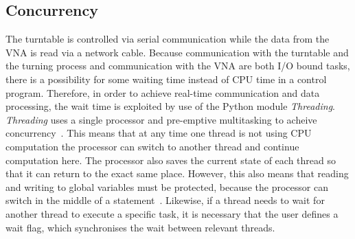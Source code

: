 \subsection{Concurrency}
The turntable is controlled via serial communication while the data from the VNA is read via a network cable. Because communication with the turntable and the turning process and communication with the VNA are both I/O bound tasks, there is a possibility for some waiting time instead of CPU time in a control program. Therefore, in order to achieve real-time communication and data processing, the wait time is exploited by use of the Python module \textit{Threading}. \textit{Threading} uses a single processor and pre-emptive multitasking to acheive concurrency~\cite{concurrency}. This means that at any time one thread is not using CPU computation the processor can switch to another thread and continue computation here. The processor also saves the current state of each thread so that it can return to the exact same place. However, this also means that reading and writing to global variables must be protected, because the processor can switch in the middle of a statement~\cite{concurrency}. Likewise, if a thread needs to wait for another thread to execute a specific task, it is necessary that the user defines a wait flag, which synchronises the wait between relevant threads.



